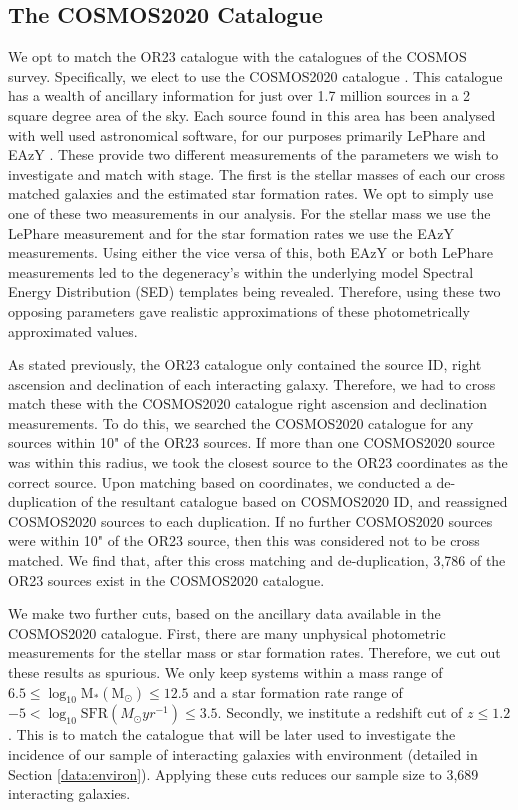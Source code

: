 \documentclass[fleqn,usenatbib]{mnras}
\begin{document}
\subsection{The COSMOS2020 Catalogue}
We opt to match the OR23 catalogue with the catalogues of the COSMOS survey. Specifically, we elect to use the COSMOS2020 catalogue \citep{2022ApJS..258...11W}. This catalogue has a wealth of ancillary information for just over 1.7 million sources in a 2 square degree area of the sky. Each source found in this area has been analysed with well used astronomical software, for our purposes primarily LePhare \citep{1999MNRAS.310..540A, 2006A&A...457..841I} and EAzY \citep{2008ApJ...686.1503B}. These provide two different measurements of the parameters we wish to investigate and match with stage. The first is the stellar masses of each our cross matched galaxies and the estimated star formation rates. We opt to simply use one of these two measurements in our analysis. For the stellar mass we use the LePhare measurement and for the star formation rates we use the EAzY measurements. Using either the vice versa of this, both EAzY or both LePhare measurements led to the degeneracy's within the underlying model Spectral Energy Distribution (SED) templates being revealed. Therefore, using these two opposing parameters gave realistic approximations of these photometrically approximated values. 

As stated previously, the OR23 catalogue only contained the source ID, right ascension and declination of each interacting galaxy. Therefore, we had to cross match these with the COSMOS2020 catalogue right ascension and declination measurements. To do this, we searched the COSMOS2020 catalogue for any sources within 10" of the OR23 sources. If more than one COSMOS2020 source was within this radius, we took the closest source to the OR23 coordinates as the correct source. Upon matching based on coordinates, we conducted a de-duplication of the resultant catalogue based on COSMOS2020 ID, and reassigned COSMOS2020 sources to each duplication. If no further COSMOS2020 sources were within 10" of the OR23 source, then this was considered not to be cross matched. We find that, after this cross matching and de-duplication, 3,786 of the OR23 sources exist in the COSMOS2020 catalogue.

We make two further cuts, based on the ancillary data available in the COSMOS2020 catalogue. First, there are many unphysical photometric measurements for the stellar mass or star formation rates. Therefore, we cut out these results as spurious. We only keep systems within a mass range of $6.5 \leq \log_{10} \text{M}_{*}(\text{M}_{\odot}) \leq 12.5$ and a star formation rate range of $-5 < \log_{10} \text{SFR} (M_{\odot}yr^{-1}) \leq 3.5$. Secondly, we institute a redshift cut of $z \leq 1.2$. This is to match the catalogue that will be later used to investigate the incidence of our sample of interacting galaxies with environment (detailed in Section \ref{data:environ}). Applying these cuts reduces our sample size to 3,689 interacting galaxies.
\end{document}

